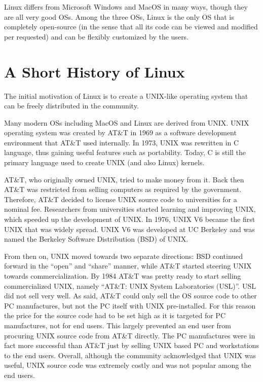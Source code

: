 Linux differs from Microsoft Windows and MacOS in many ways, though they are all very good OSs. Among the three OSs, Linux is the only OS that is completely open-source (in the sense that all its code can be viewed and modified per requested) and can be flexibly customized by the users.

\section{A Short History of Linux}

The initial motivation of Linux is to create a UNIX-like operating system that can be freely distributed in the community.

Many modern OSs including MacOS and Linux are derived from UNIX. UNIX operating system was created by AT\&T in 1969 as a software development environment that AT\&T used internally. In 1973, UNIX was rewritten in C language, thus gaining useful features such as portability. Today, C is still the primary language used to create UNIX (and also Linux) kernels.

AT\&T, who originally owned UNIX, tried to make money from it. Back then AT\&T was restricted from selling computers as required by the government. Therefore, AT\&T decided to license UNIX source code to universities for a nominal fee. Researchers from universities started learning and improving UNIX, which speeded up the development of UNIX. In 1976, UNIX V6 became the first UNIX that was widely spread. UNIX V6 was developed at UC Berkeley and was named the Berkeley Software Distribution (BSD) of UNIX.

From then on, UNIX moved towards two separate directions: BSD continued forward in the ``open'' and ``share'' manner, while AT\&T started steering UNIX towards commercialization. By 1984 AT\&T was pretty ready to start selling commercialized UNIX, namely ``AT\&T: UNIX System Laboratories (USL)''. USL did not sell very well. As said, AT\&T could only sell the OS source code to other PC manufactures, but not the PC itself with UNIX pre-installed. For this reason the price for the source code had to be set high as it is targeted for PC manufactures, not for end users. This largely prevented an end user from procuring UNIX source code from AT\&T directly. The PC manufactures were in fact more successful than AT\&T just by selling UNIX based PC and workstations to the end users. Overall, although the community acknowledged that UNIX was useful, UNIX source code was extremely costly and was not popular among the end users.


